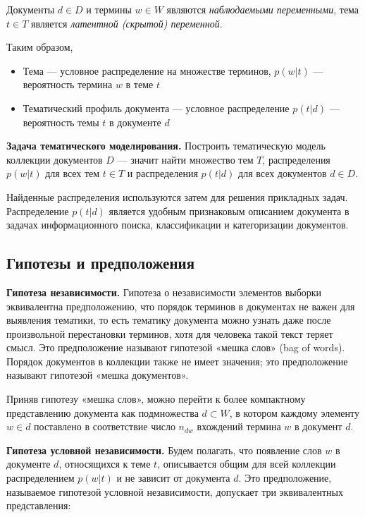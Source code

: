 \documentclass[12pt, a4paper, substylefile = spbu.rtx]{disser}
\theoremstyle{definition}
\begin{document}
Документы $d\in D$ и термины $w\in W$ являются \textit{наблюдаемыми переменными}, тема $t\in T$ является \textit{латентной (скрытой) переменной}.
   
   Таким образом,
   
   \begin{itemize} 
\item Тема --- условное распределение на множестве терминов,
$p(w|t)$ --- вероятность термина $w$ в теме $t$
\item Тематический профиль документа --- условное распределение
$p(t|d)$ --- вероятность темы $t$ в документе $d$
\end{itemize}
   
   \textbf{Задача тематического моделирования.} Построить тематическую модель коллекции документов $D$ --- значит найти множество тем $T$, распределения $p(w|t)$ для всех тем $t\in T $ и распределения $p(t|d)$ для всех документов $d\in D$. 

Найденные распределения используются затем для решения прикладных задач. Распределение $p(t|d)$ является удобным признаковым описанием документа в задачах информационного поиска, классификации и категоризации документов.

  \renewcommand{\algorithmicrequire}{\textbf{Input:}}
\renewcommand{\algorithmicensure}{\textbf{Output:}}

   
  \subsection{Гипотезы и предположения} 
   
   \textbf{Гипотеза независимости.} Гипотеза о независимости элементов выборки эквивалентна предположению,
что порядок терминов в документах не важен для выявления тематики, то есть тематику документа можно узнать даже после произвольной перестановки терминов, хотя для человека такой текст теряет смысл. Это предположение называют гипотезой «мешка слов» (bag of words). Порядок документов в коллекции также не имеет значения; это предположение называют гипотезой «мешка документов».

Приняв гипотезу «мешка слов», можно перейти к более компактному представлению документа как подмножества $d\subset W$, в котором каждому элементу $w\in d$ поставлено в соответствие число $n_{dw}$ вхождений термина $w$ в документ $d$.
   
   \textbf{Гипотеза условной независимости.} Будем полагать, что появление слов $w$ в документе $d$, относящихся к теме $t$, описывается общим для всей коллекции распределением $p(w |t)$ и не зависит от документа $d$. Это предположение, называемое гипотезой условной независимости, допускает три эквивалентных представления:
   
\end{document}
